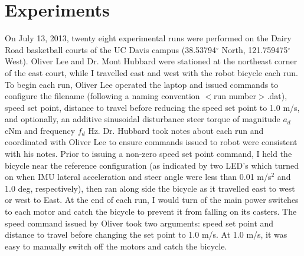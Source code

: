 \section{Experiments} \label{rb:sec:experiments}

On July 13, 2013, twenty eight experimental runs were performed on the Dairy
Road basketball courts of the UC Davis campus (38.53794$^{\circ}$ North,
121.759475$^{\circ}$ West). Oliver Lee and Dr. Mont Hubbard were stationed at the
northeast corner of the east court, while I travelled east and west with the
robot bicycle each run. To begin each run, Oliver Lee operated the laptop and
issued commands to configure the filename (following a naming convention $<$run
number$>$.dat), speed set point, distance to travel before reducing the speed
set point to 1.0 m/s, and optionally, an additive sinusoidal disturbance steer
torque of magnitude $a_d$ cNm and frequency $f_d$ Hz. Dr. Hubbard took notes
about each run and coordinated with Oliver Lee to ensure commands issued to robot
were consistent with his notes. Prior to issuing a non-zero speed set point
command, I held the bicycle near the reference configuration (as indicated by
two LED's which turned on when IMU lateral acceleration and steer angle were
less than 0.01 m/s$^2$ and 1.0 deg, respectively), then ran along side the
bicycle as it travelled east to west or west to East. At the end of each run, I
would turn of the main power switches to each motor and catch the bicycle to
prevent it from falling on its casters.  The speed command issued by Oliver
took two arguments: speed set point and distance to travel before changing the
set point to 1.0 m/s. At 1.0 m/s, it was easy to manually switch off the motors
and catch the bicycle.
